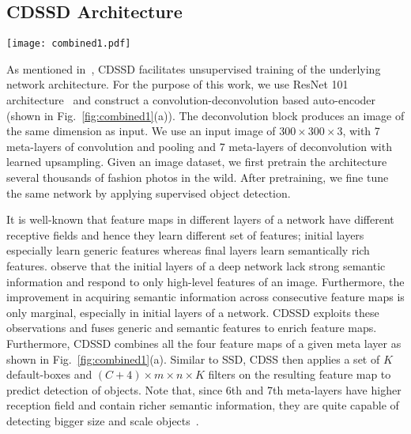 \documentclass[sigconf]{acmart}
\begin{document}
\subsection{CDSSD Architecture}

\begin{figure*}[t]
\centering
\texttt{[image: combined1.pdf]}
\caption{CDSSD combines information from convolution and deconvolution feature maps}
\label{fig:combined1}
\end{figure*}

As mentioned in~\cite{CDSSD18},
CDSSD facilitates unsupervised training of 
the underlying network architecture.
For the purpose of this work,
we use ResNet 101 architecture~\cite{resnet101} and construct
a convolution-deconvolution based auto-encoder
(shown in Fig.~\ref{fig:combined1}(a)).
The deconvolution block produces an image of the same dimension as input.
We use an input image of $300 \times 300 \times 3$, with 7 meta-layers of convolution
and pooling and 7 meta-layers of deconvolution with learned upsampling.
Given an image dataset, we first pretrain the architecture 
several thousands of fashion photos in the wild.
After pretraining, we fine tune the same network 
by applying supervised object detection.

It is well-known that feature maps in different layers
of a network have different receptive fields and hence
they learn different set of features; initial layers
especially learn generic features whereas final layers
learn semantically rich features.
\cite{objectdetectorref1,objectdetectorref2} observe
that the initial layers of a deep network lack 
strong semantic information and respond to only
high-level features of an image.
Furthermore, the improvement in acquiring semantic
information across consecutive feature maps is only marginal,
especially in initial layers of a network.
CDSSD exploits these observations
and fuses generic and semantic features to enrich feature maps.
Furthermore, CDSSD combines all the four feature maps of a given
meta layer as shown in Fig.~\ref{fig:combined1}(a).
Similar to SSD, CDSS then applies a set of $K$ default-boxes
and $(C + 4) \times m \times n \times K$ filters on the resulting
feature map to predict detection of objects.
Note that, since 6th and 7th meta-layers have higher reception field
and contain richer semantic information,
they are quite capable of 
detecting bigger size and scale objects~\cite{FuLRTB17}.
\end{document}
